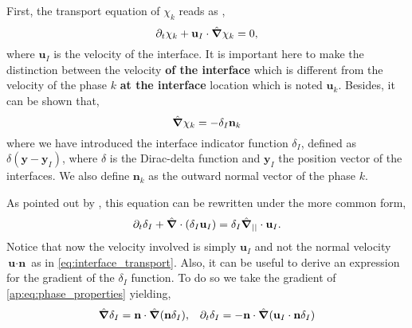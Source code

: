 First, the transport equation of $\chi_k$ reads as \citep{drew1983mathematical,kataoka1986local,morel2015mathematical},
\begin{equation}
    \partial_t \chi_k
    + \textbf{u}_I \cdot \hat{\bm{\nabla}} \chi_k
    = 0,
    \label{eq:phaseindicator_transport}
\end{equation}
where $\textbf{u}_I$ is the velocity of the interface.
It is important here to make the distinction between the velocity \textbf{of the interface} which is different from the velocity of the phase $k$ \textbf{at the interface} location which is noted $\textbf{u}_k$.
Besides, it can be shown \citep{tryggvason2011direct} that,
\begin{equation}
    \hat{\bm{\nabla}} \chi_k
    = - \delta_I \textbf{n}_k
\end{equation}
where we have introduced the interface indicator function $\delta_I$, defined as $\delta(\textbf{y}-\textbf{y}_I)$, where $\delta$ is the Dirac-delta function and $\textbf{y}_I$ the position vector of the interfaces.
We also define $\textbf{n}_k$ as the outward normal vector of the phase $k$.

As pointed out by \citet{morel2007surface}, this equation can be rewritten under the more common form,
\begin{equation}
    \partial_t \delta_I
    + \hat{\bm{\nabla}} \cdot (\delta_I \textbf{u}_I)
    = \delta_I \hat{\bm{\nabla}}_{||} \cdot \textbf{u}_I.
    \label{eq:interface_transport2}
\end{equation}
Notice that now the velocity involved is simply $\textbf{u}_I$ and not the normal velocity $\textbf{u} \cdot \textbf{n}$ as in \ref{eq:interface_transport}.
Also, it can be useful to derive an expression for the gradient of the $\delta_I$ function. 
To do so we take the gradient of \ref{ap:eq:phase_properties} yielding, 
\begin{align*}
    &\hat{\bm{\nabla}}\delta_I 
    = \textbf{n} \cdot \hat{\bm{\nabla}} (\textbf{n} \delta_I),
    &
    \partial_t\delta_I 
    = - \textbf{n} \cdot \hat{\bm{\nabla}} (\textbf{u}_I  \cdot \textbf{n} \delta_I)
\end{align*}


